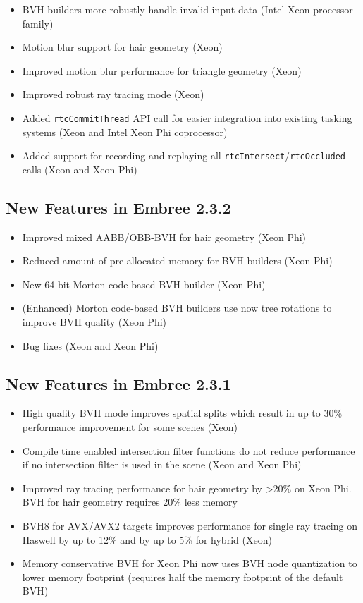 \begin{itemize}
\tightlist
\item
  BVH builders more robustly handle invalid input data (Intel Xeon
  processor family)
\item
  Motion blur support for hair geometry (Xeon)
\item
  Improved motion blur performance for triangle geometry (Xeon)
\item
  Improved robust ray tracing mode (Xeon)
\item
  Added \texttt{rtcCommitThread} API call for easier integration into
  existing tasking systems (Xeon and Intel Xeon Phi coprocessor)
\item
  Added support for recording and replaying all
  \texttt{rtcIntersect}/\texttt{rtcOccluded} calls (Xeon and Xeon Phi)
\end{itemize}

\subsection{New Features in Embree
2.3.2}\label{new-features-in-embree-2.3.2}

\begin{itemize}
\tightlist
\item
  Improved mixed AABB/OBB-BVH for hair geometry (Xeon Phi)
\item
  Reduced amount of pre-allocated memory for BVH builders (Xeon Phi)
\item
  New 64-bit Morton code-based BVH builder (Xeon Phi)
\item
  (Enhanced) Morton code-based BVH builders use now tree rotations to
  improve BVH quality (Xeon Phi)
\item
  Bug fixes (Xeon and Xeon Phi)
\end{itemize}

\subsection{New Features in Embree
2.3.1}\label{new-features-in-embree-2.3.1}

\begin{itemize}
\tightlist
\item
  High quality BVH mode improves spatial splits which result in up to
  30\% performance improvement for some scenes (Xeon)
\item
  Compile time enabled intersection filter functions do not reduce
  performance if no intersection filter is used in the scene (Xeon and
  Xeon Phi)
\item
  Improved ray tracing performance for hair geometry by \textgreater20\%
  on Xeon Phi. BVH for hair geometry requires 20\% less memory
\item
  BVH8 for AVX/AVX2 targets improves performance for single ray tracing
  on Haswell by up to 12\% and by up to 5\% for hybrid (Xeon)
\item
  Memory conservative BVH for Xeon Phi now uses BVH node quantization to
  lower memory footprint (requires half the memory footprint of the
  default BVH)
\end{itemize}

